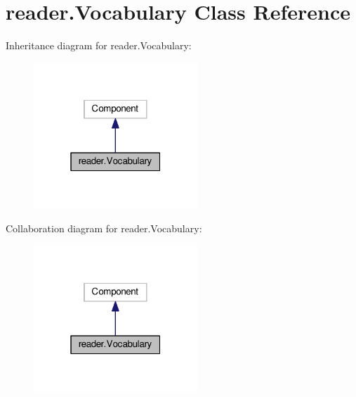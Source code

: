 \hypertarget{classreader_1_1Vocabulary}{}\section{reader.\+Vocabulary Class Reference}
\label{classreader_1_1Vocabulary}


Inheritance diagram for reader.\+Vocabulary\+:
\nopagebreak
\begin{figure}[H]
\begin{center}
\leavevmode
\includegraphics[width=175pt]{classreader_1_1Vocabulary__inherit__graph}
\end{center}
\end{figure}


Collaboration diagram for reader.\+Vocabulary\+:
\nopagebreak
\begin{figure}[H]
\begin{center}
\leavevmode
\includegraphics[width=175pt]{classreader_1_1Vocabulary__coll__graph}
\end{center}
\end{figure}
